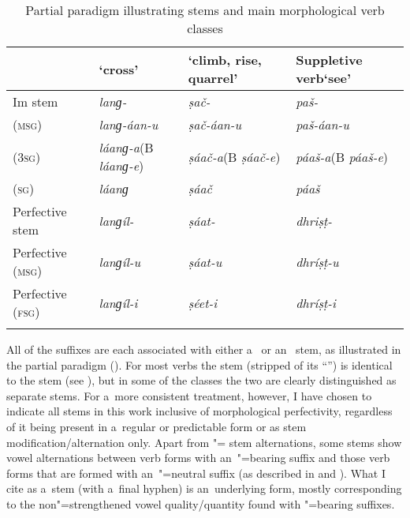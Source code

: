 \begin{table}[ht]
\caption{Partial paradigm illustrating stems and main morphological verb classes}

\begin{tabularx}{\textwidth}{ l P{20mm} P{37mm} P{27mm} }
\lsptoprule
& \newline `cross' &
\newline `climb, rise, quarrel' &
Suppletive verb\newline `see'\\\midrule
Im stem &
\textit{lanɡ-} &
\textit{ṣač-} &
\textit{paš-} \\
 (\textsc{msg}) &
\textit{lanɡ-áan-u} &
\textit{ṣač-áan-u} &
\textit{paš-áan-u} \\
 (\textsc{3sg}) &
\textit{láanɡ-a}\newline (B \textit{láanɡ-e}) &
\textit{ṣáač-a}\newline (B \textit{ṣáač-e}) &
\textit{páaš-a}\newline (B \textit{páaš-e}) \\
 (\textsc{sg}) &
\textit{láanɡ} &
\textit{ṣáač} &
\textit{páaš} \\
Perfective stem &
\textit{lanɡíl-} &
\textit{ṣáat-} &
\textit{dhriṣṭ-} \\
Perfective (\textsc{msg}) &
\textit{lanɡíl-u} &
\textit{ṣáat-u} &
\textit{dhríṣṭ-u} \\
Perfective (\textsc{fsg}) &
\textit{lanɡíl-i} &
\textit{ṣéet-i} &
\textit{dhríṣṭ-i} \\\lspbottomrule
\end{tabularx}
\label{tab:8-3}
\end{table}


All of the  suffixes are each associated with either a~ or an~
stem, as illustrated in the partial paradigm (). For most verbs the  stem
(stripped of its  ``'') is identical to the  stem (see ), but
in some of the classes the two are clearly distinguished as separate stems. For a~more consistent
treatment, however, I have chosen to indicate all  stems in this work inclusive of
morphological perfectivity, regardless of it being present in a~regular or predictable form or as
stem modification/alternation only. Apart from "= stem alternations, some
 stems show vowel alternations between  verb forms with an~"=bearing
suffix and those  verb forms that are formed with an~"=neutral suffix (as described
in  and ). What I cite as a~stem (with a~final hyphen) is an~underlying form, mostly
corresponding to the non"=strengthened vowel quality/quantity found with "=bearing suffixes.


